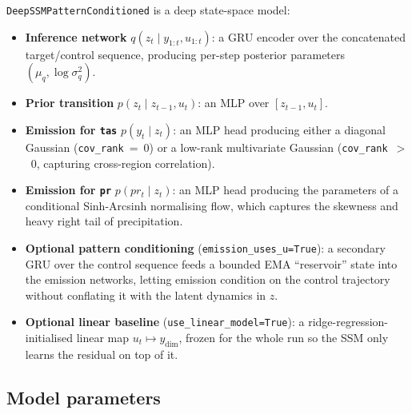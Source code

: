 \documentclass[11pt]{article}
\begin{document}
\texttt{DeepSSMPatternConditioned} is a deep state-space model:

\begin{itemize}
  \item \textbf{Inference network} $q(z_t \mid y_{1:t}, u_{1:t})$: a GRU
    encoder over the concatenated target/control sequence, producing
    per-step posterior parameters $(\mu_q, \log\sigma_q^2)$.
  \item \textbf{Prior transition} $p(z_t \mid z_{t-1}, u_t)$: an MLP over
    $[z_{t-1}, u_t]$.
  \item \textbf{Emission for \texttt{tas}} $p(y_t \mid z_t)$: an MLP head
    producing either a diagonal Gaussian (\texttt{cov\_rank}~=~0) or a
    low-rank multivariate Gaussian (\texttt{cov\_rank}~$>$~0, capturing
    cross-region correlation).
  \item \textbf{Emission for \texttt{pr}} $p(pr_t \mid z_t)$: an MLP head
    producing the parameters of a conditional Sinh-Arcsinh normalising
    flow, which captures the skewness and heavy right tail of
    precipitation.
  \item \textbf{Optional pattern conditioning}
    (\texttt{emission\_uses\_u=True}): a secondary GRU over the control
    sequence feeds a bounded EMA ``reservoir'' state into the emission
    networks, letting emission condition on the control trajectory without
    conflating it with the latent dynamics in $z$.
  \item \textbf{Optional linear baseline} (\texttt{use\_linear\_model=True}):
    a ridge-regression-initialised linear map $u_t \mapsto y_{\mathrm{dim}}$,
    frozen for the whole run so the SSM only learns the residual on top of
    it.
\end{itemize}

\subsection{Model parameters}
\end{document}
